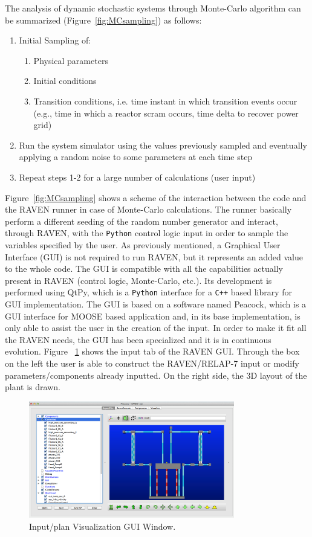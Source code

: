 \documentclass{mc2013}
\begin{document}
The analysis of dynamic stochastic systems through Monte-Carlo algorithm can be summarized (Figure~\ref{fig:MCsampling}) as follows:
\begin{enumerate}
\item Initial Sampling of:
       \begin{enumerate}
       \item Physical parameters
       \item Initial conditions
       \item Transition conditions, i.e. time instant in which transition events occur (e.g., time in which a reactor scram occurs, time delta to recover power grid)
    \end{enumerate}
\item Run the system simulator using the values previously sampled and eventually applying a random noise to some parameters at each time step
\item Repeat steps 1-2 for a large number of calculations (user input)
\end{enumerate}
Figure~\ref{fig:MCsampling} shows a scheme of the interaction between the code and the RAVEN runner in case of Monte-Carlo calculations. The runner basically perform a different seeding of the random number generator and interact, through RAVEN, with the \verb!Python! control logic input in order to sample the variables specified by the user.
\label{sec:GUI}
As previously mentioned, a Graphical User Interface (GUI) is not required to run RAVEN, but it represents an added value to the whole code. The GUI is compatible with all the capabilities actually present in RAVEN (control logic, Monte-Carlo, etc.).  Its development is performed using QtPy, which is a \verb!Python! interface for a \verb!C++! based library for GUI implementation. The GUI is based on a software named Peacock, which is a GUI interface for MOOSE based application and, in its base implementation, is only able to assist the user in the creation of the input.  In order to make it fit all the RAVEN needs, the GUI has been specialized and it is in continuous evolution. Figure ~\ref{fig:RavenGUI} shows the input tab of the RAVEN GUI. Through the box on the left the user is able to construct the RAVEN/RELAP-7 input or modify parameters/components already inputted. On the right side, the 3D layout of the plant is drawn. 
\begin{figure}[h]
   \centering
    \includegraphics[width=0.8\textwidth]{figures/RavenGUI.PNG}
    \caption{Input/plan Visualization GUI Window.}
    \label{fig:RavenGUI}
\end{figure}
\end{document}
